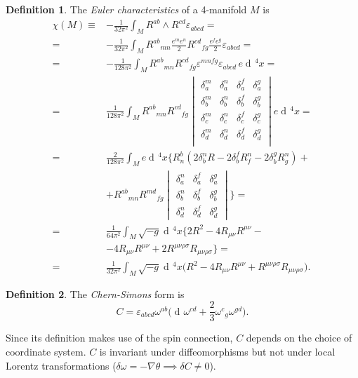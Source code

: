 \documentclass[a4paper,12pt]{book}
\newcommand{\dd}{\mathop{\mathrm{d}\!}{}}
\renewcommand{\epsilon}{\varepsilon}
\theoremstyle{definition}
\newtheorem{definition}{Definition}
\theoremstyle{remark}
\begin{document}
\begin{definition}
The \emph{Euler characteristics} of a 4-manifold $M$ is
\begin{align*}
\chi(M)\equiv{}&-\frac1{32\pi^2}\int_MR^{ab}\wedge R^{cd}\epsilon_{abcd}=\\
={}&-\frac1{32\pi^2}\int_MR^{ab}{}_{mn}\frac{e^me^n}{2}R^{cd}{}_{fg}\frac{e^fe^g}{2}\epsilon_{abcd}=\\
={}&-\frac1{128\pi^2}\int_MR^{ab}{}_{mn}R^{cd}{}_{fg}\epsilon^{mnfg}\epsilon_{abcd}\,e\dd^4x=\\
={}&\frac1{128\pi^2}\int_MR^{ab}{}_{mn}R^{cd}{}_{fg}
\begin{vmatrix}
\delta^m_a & \delta^n_a & \delta^f_a & \delta^g_a\\
\delta^m_b & \delta^n_b & \delta^f_b & \delta^g_b\\
\delta^m_c & \delta^n_c & \delta^f_c & \delta^g_c\\
\delta^m_d & \delta^n_d & \delta^f_d & \delta^g_d\\
\end{vmatrix}
e\dd^4x=\\
={}&\frac2{128\pi^2}\int_Me\dd^4x\biggl\{R^b_n(2\delta^n_bR-2\delta^f_bR^n_f-2\delta^g_bR^n_g)+{}\\
&+R^{ab}{}_{mn}R^{md}{}_{fg}
\begin{vmatrix}
\delta^n_a & \delta^f_a & \delta^g_a\\
\delta^n_b & \delta^f_b & \delta^g_b\\
\delta^n_d & \delta^f_d & \delta^g_d
\end{vmatrix}
\biggr\}=\\
={}&\frac1{64\pi^2}\int_M\sqrt{-g}\dd^4x\bigl\{2R^2-4R_{\mu\nu}R^{\mu\nu}-{}\\
&-4R_{\mu\nu}R^{\mu\nu}+2R^{\mu\nu\rho\sigma}R_{\mu\nu\rho\sigma}\bigr\}=\\
={}&\frac1{32\pi^2}\int_M\sqrt{-g}\dd^4x\bigl(R^2-4R_{\mu\nu}R^{\mu\nu}+R^{\mu\nu\rho\sigma}R_{\mu\nu\rho\sigma}\bigr).
\end{align*}
\end{definition}

\begin{definition}
The \emph{Chern-Simons} form is
\[C=\epsilon_{abcd}\omega^{ab}\biggl(\dd\omega^{cd}+\frac23\omega^c{}_g\omega^{gd}\biggr).\]
\end{definition}

Since its definition makes use of the spin connection, $C$ depends on the choice of coordinate system. $C$ is invariant under diffeomorphisms but not under local Lorentz transformations ($\delta\omega=-\nabla\theta\implies\delta C\ne0$).
\end{document}
